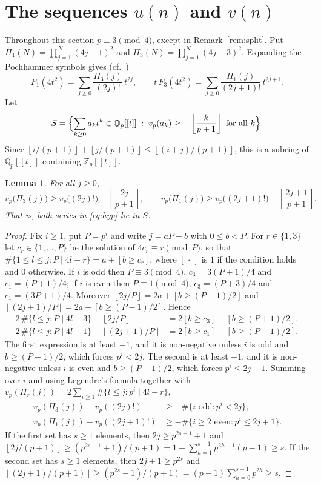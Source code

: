 \documentclass[11pt]{amsart}
\newtheorem{lemma}[theorem]{Lemma}
\theoremstyle{definition}
\theoremstyle{remark}
\newcommand{\Z}{\mathbb{Z}}
\newcommand{\Q}{\mathbb{Q}}
\newcommand{\fl}[1]{\left\lfloor #1 \right\rfloor}
\begin{document}
\section{The sequences $u(n)$ and $v(n)$}\label{sec:uv}

Throughout this section $p\equiv3\pmod4$, except in Remark~\ref{rem:split}. Put
$\Pi_1(N)=\prod_{j=1}^N(4j-1)^2$ and $\Pi_3(N)=\prod_{j=1}^N(4j-3)^2$. Expanding the Pochhammer
symbols gives (cf.\ \cite[\S2]{KM})
\begin{equation}\label{eq:hyp}
F_1(4t^2)=\sum_{j\ge0}\frac{\Pi_3(j)}{(2j)!}\,t^{2j},\qquad
t\,F_3(4t^2)=\sum_{j\ge0}\frac{\Pi_1(j)}{(2j+1)!}\,t^{2j+1}.
\end{equation}
Let
\[
S=\Bigl\{\sum_{k\ge0}a_kt^k\in\Q_p[[t]]\;:\;v_p(a_k)\ge-\fl{\frac{k}{p+1}}\text{ for all }k\Bigr\}.
\]
Since $\fl{i/(p+1)}+\fl{j/(p+1)}\le\fl{(i+j)/(p+1)}$, this is a subring of $\Q_p[[t]]$ containing
$\Z_p[[t]]$.

\begin{lemma}\label{lem:products}
For all $j\ge0$,
\[
v_p\bigl(\Pi_3(j)\bigr)\ge v_p\bigl((2j)!\bigr)-\fl{\frac{2j}{p+1}},\qquad
v_p\bigl(\Pi_1(j)\bigr)\ge v_p\bigl((2j+1)!\bigr)-\fl{\frac{2j+1}{p+1}} .
\]
That is, both series in \eqref{eq:hyp} lie in $S$.
\end{lemma}

\begin{proof}
Fix $i\ge1$, put $P=p^i$ and write $j=aP+b$ with $0\le b<P$. For $r\in\{1,3\}$ let
$c_r\in\{1,\dots,P\}$ be the solution of $4c_r\equiv r\pmod P$, so that
$\#\{1\le l\le j:P\mid 4l-r\}=a+[b\ge c_r]$, where $[\,\cdot\,]$ is $1$ if the condition holds and
$0$ otherwise. If $i$ is odd then $P\equiv3\pmod4$, $c_3=3(P+1)/4$ and $c_1=(P+1)/4$; if $i$ is
even then $P\equiv1\pmod4$, $c_3=(P+3)/4$ and $c_1=(3P+1)/4$. Moreover
$\fl{2j/P}=2a+[b\ge(P+1)/2]$ and $\fl{(2j+1)/P}=2a+[b\ge(P-1)/2]$. Hence
\begin{align*}
2\,\#\{l\le j:P\mid4l-3\}-\fl{2j/P}&=2[b\ge c_3]-[b\ge(P+1)/2],\\
2\,\#\{l\le j:P\mid4l-1\}-\fl{(2j+1)/P}&=2[b\ge c_1]-[b\ge(P-1)/2].
\end{align*}
The first expression is at least $-1$, and it is non-negative unless $i$ is odd and
$b\ge(P+1)/2$, which forces $p^i<2j$. The second is at least $-1$, and it is non-negative unless
$i$ is even and $b\ge(P-1)/2$, which forces $p^i\le2j+1$. Summing over $i$ and using Legendre's
formula together with $v_p(\Pi_r(j))=2\sum_{i\ge1}\#\{l\le j:p^i\mid4l-r\}$,
\begin{align*}
v_p(\Pi_3(j))-v_p((2j)!)&\ge-\#\{i\text{ odd}:p^i<2j\},\\
v_p(\Pi_1(j))-v_p((2j+1)!)&\ge-\#\{i\ge2\text{ even}:p^i\le2j+1\}.
\end{align*}
If the first set has $s\ge1$ elements, then $2j\ge p^{2s-1}+1$ and
$\fl{2j/(p+1)}\ge(p^{2s-1}+1)/(p+1)=1+\sum_{h=1}^{s-1}p^{2h-1}(p-1)\ge s$. If the second set has
$s\ge1$ elements, then $2j+1\ge p^{2s}$ and
$\fl{(2j+1)/(p+1)}\ge(p^{2s}-1)/(p+1)=(p-1)\sum_{h=0}^{s-1}p^{2h}\ge s$.
\end{proof}
\end{document}
